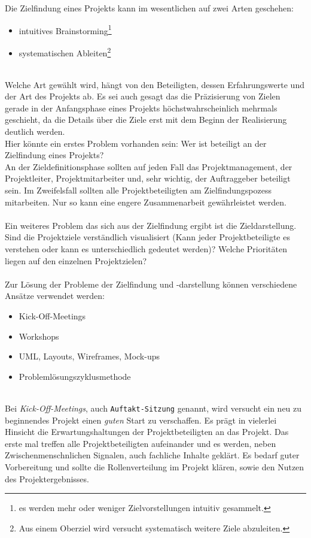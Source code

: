 \documentclass[11pt]{scrartcl}
\begin{document}
Die Zielfindung eines Projekts kann im wesentlichen auf zwei Arten geschehen:
\begin{itemize}
    \item{intuitives Brainstorming\footnote{es werden mehr oder weniger Zielvorstellungen intuitiv gesammelt.}}
    \item{systematischen Ableiten\footnote{Aus einem Oberziel wird versucht systematisch weitere Ziele abzuleiten.}}
\end{itemize}
\ \\
Welche Art gewählt wird, hängt von den Beteiligten, dessen Erfahrungswerte und der Art des Projekts ab. Es sei auch gesagt das die Präzisierung von Zielen gerade in der Anfangsphase eines Projekts höchstwahrscheinlich mehrmals geschieht, da die Details über die Ziele erst mit dem Beginn der Realisierung deutlich werden. \\
Hier könnte ein erstes Problem vorhanden sein: Wer ist beteiligt an der Zielfindung eines Projekts?\\ 
An der Zieldefinitionsphase sollten auf jeden Fall das Projektmanagement, der Projektleiter, Projektmitarbeiter und, sehr wichtig, der Auftraggeber beteiligt sein. Im Zweifelsfall sollten alle Projektbeteiligten am Zielfindungspozess mitarbeiten. Nur so kann eine engere Zusammenarbeit gewährleistet werden.\\
\\
Ein weiteres Problem das sich aus der Zielfindung ergibt ist die Zieldarstellung. Sind die Projektziele verständlich visualisiert (Kann jeder Projektbeteiligte es verstehen oder kann es unterschiedlich gedeutet werden)? Welche Prioritäten liegen auf den einzelnen Projektzielen? \\
\\
Zur Lösung der Probleme der Zielfindung und -darstellung können verschiedene Ansätze verwendet werden:
\begin{itemize}
    \item{Kick-Off-Meetings}
    
    \item{Workshops}
    
    \item{UML, Layouts, Wireframes, Mock-ups}
    
    \item{Problemlösungszyklusmethode}
    
\end{itemize}
\ \\
Bei \textit{Kick-Off-Meetings}, auch \texttt{Auftakt-Sitzung} genannt, wird versucht ein neu zu beginnendes Projekt einen \textit{guten} Start zu verschaffen. Es prägt in vielerlei Hinsicht die Erwartungshaltungen der Projektbeteiligten an das Projekt. Das erste mal treffen alle Projektbeteiligten aufeinander und es werden, neben Zwischenmenschnlichen Signalen, auch fachliche Inhalte geklärt. Es bedarf guter Vorbereitung und sollte die Rollenverteilung im Projekt klären, sowie den Nutzen des Projektergebnisses. \\
\end{document}
